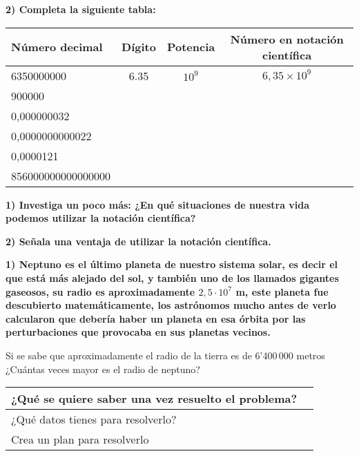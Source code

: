 \documentclass[12pt,a4paper]{article}
\begin{document}
\vspace{0.5cm}

\textbf{2) Completa la siguiente tabla:}

\vspace{0.5cm}

\begin{center}
\begin{tabular}{|l|c|c|c|}
\hline
\cellcolor{fondoazul}\textbf{Número decimal} & \textbf{Dígito} & \textbf{Potencia} & \textbf{Número en notación científica} \\
\hline
6350000000 & 6.35 & $10^9$ & $6,35 \times 10^9$ \\
\hline
900000 & & & \\
\hline
0,000000032 & & & \\
\hline
0,0000000000022 & & & \\
\hline
0,0000121 & & & \\
\hline
856000000000000000 & & & \\
\hline
\end{tabular}
\end{center}

\vspace{1cm}

\textbf{1) Investiga un poco más: ¿En qué situaciones de nuestra vida podemos utilizar la notación científica?}

\textbf{2) Señala una ventaja de utilizar la notación científica.}


\textbf{1) Neptuno es el último planeta de nuestro sistema solar, es decir el que está más alejado del sol, y también uno de los llamados gigantes gaseosos, su radio es aproximadamente $2,5 \cdot 10^7$ m, este planeta fue descubierto matemáticamente, los astrónomos mucho antes de verlo calcularon que debería haber un planeta en esa órbita por las perturbaciones que provocaba en sus planetas vecinos.}

Si se sabe que aproximadamente el radio de la tierra es de 6'400\,000 metros ¿Cuántas veces mayor es el radio de neptuno?

\vspace{0.5cm}

\begin{center}
\begin{tabular}{|l|l|}
\hline
¿Qué se quiere saber una vez resuelto el problema? & \\[1cm]
\hline
¿Qué datos tienes para resolverlo? & \\[1cm]
\hline
Crea un plan para resolverlo & \\[1cm]
\hline
\end{tabular}
\end{center}
\end{document}

